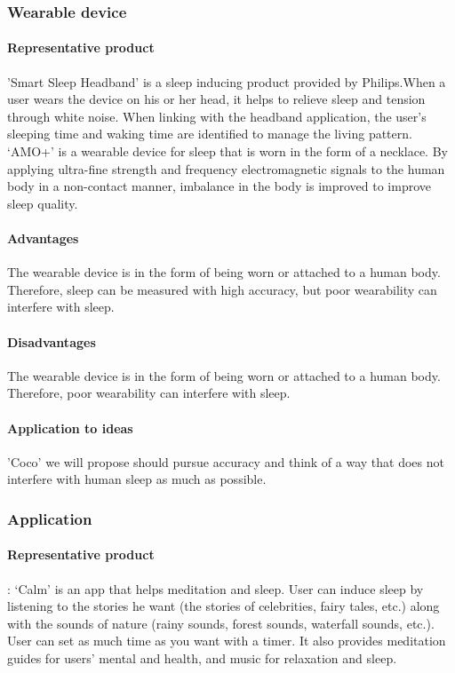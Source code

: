 \documentclass[conference]{IEEEtran}
\begin{document}
\subsubsection{Wearable device}
\paragraph{Representative product}
'Smart Sleep Headband' is a sleep inducing product provided by Philips.When a user wears the device on his or her head, it helps to relieve sleep and tension through white noise. When linking with the headband application, the user's sleeping time and waking time are identified to manage the living pattern.
\\
‘AMO+’ is a wearable device for sleep that is worn in the form of a necklace. By applying ultra-fine strength and frequency electromagnetic signals to the human body in a non-contact manner, imbalance in the body is improved to improve sleep quality.
\paragraph{Advantages}
The wearable device is in the form of being worn or attached to a human body. Therefore, sleep can be measured with high accuracy, but poor wearability can interfere with sleep.
\paragraph{Disadvantages}
The wearable device is in the form of being worn or attached to a human body. Therefore, poor wearability can interfere with sleep.
\paragraph{Application to ideas}
'Coco' we will propose should pursue accuracy and think of a way that does not interfere with human sleep as much as possible.
\vspace{1\baselineskip}
\subsubsection{Application}
\paragraph{Representative product}
: ‘Calm' is an app that helps meditation and sleep. User can induce sleep by listening to the stories he want (the stories of celebrities, fairy tales, etc.) along with the sounds of nature (rainy sounds, forest sounds, waterfall sounds, etc.). User can set as much time as you want with a timer. It also provides meditation guides for users' mental and health, and music for relaxation and sleep.
\end{document}
